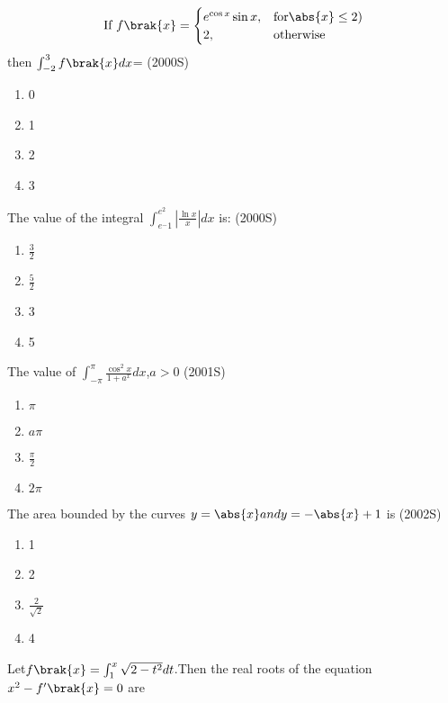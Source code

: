\iffalse
\title{DEFINITE INTEGRALS}
\author{BHUKYA PRAJWAL NAIK}
\section{mcq-single}
\fi

\item
\begin{equation}
	\text{If } f\brak{x} = 
\begin{cases}
	e^{\cos x}\sin x, & \text{for} \abs{x} \leq 2)\\
	2, & \text{otherwise}\\
\end{cases}
\end{equation}
then $\int_{-2}^{3}f\brak{x} dx$=
		\hfill(2000S)
\begin{enumerate}
    \item 0
    \item 1
    \item 2
    \item 3
\end{enumerate}
\item The value of the integral $\int_{e^-1}^{e^2}\left|\frac{\ln x}{x}\right| dx$ is:
	\hfill(2000S)
\begin{enumerate}
	\item $\frac{3}{2}$
	\item $\frac{5}{2}$
    \item  3
    \item  5
\end{enumerate}
\item The value of $\int_{-\pi}^{\pi}\frac{\cos^2 x}{1+a^ x } dx$,$a>0$
	\hfill(2001S)
\begin{enumerate}
    \item$\pi$
    \item $a\pi$
    \item $\frac{\pi}{2}$
    \item $2\pi$
\end{enumerate}
\item The area bounded by the curves $y=\abs{x} and y=-\abs{x}+1$ is
	\hfill(2002S)
\begin{enumerate}
 \item  1
 \item  2
 \item  $\frac{2}{\sqrt{2}}$
 \item  4
\end{enumerate}
\item Let$f\brak{x}=\int_{1}^{x}\sqrt{2-{t}^2} dt $.Then the real roots of the equation ${x}^2-f'\brak{x}=0$ are 
